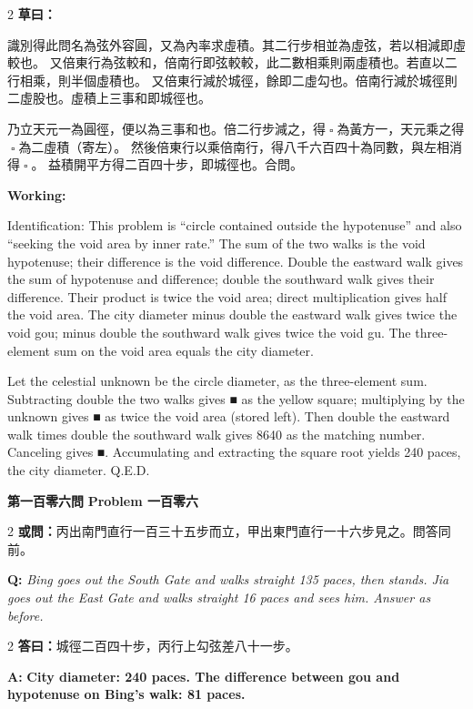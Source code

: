 \documentclass[11pt,a4paper]{article}
\let\origsquare\square
\renewcommand{\square}{\ensuremath{\origsquare}}%
\newcommand{\wen}[1]{%
  \par\vspace{0.5em}%
  \noindent\textcolor{problemcolor}{\textbf{第#1問}}%
  \hfill\textcolor{problemcolor}{\textbf{Problem #1}}\par\nopagebreak%
  \vspace{0.3em}%
}
\newcommand{\owen}[1]{%
  \noindent\textcolor{problemcolor}{\textbf{或問：}}{\tradfont #1}\par\nopagebreak%
}
\newcommand{\oweneng}[1]{%
  \noindent\textcolor{engcolor}{\textbf{Q: }}{\itshape #1}\par\nopagebreak%
}
\newcommand{\tsaoyue}[1]{%
  \noindent\textcolor{workcolor}{\textbf{草曰：}}{\tradfont #1}\par%
}
\newcommand{\tsaoyueeng}[1]{%
  \noindent\textcolor{engcolor}{\textbf{Working: }}{\small #1}\par%
}
\newcommand{\dayue}[1]{%
  \noindent\textcolor{anscolor}{\textbf{答曰：}}{\tradfont #1}\par\nopagebreak%
}
\newcommand{\dayueeng}[1]{%
  \noindent\textcolor{engcolor}{\textbf{A: }}{\bfseries #1}\par\nopagebreak%
}
\begin{document}
\begin{paracol}{2}
\tsaoyue{%
識別得此問名為弦外容圓，又為內率求虛積。其二行步相並為虛弦，若以相減即虛較也。
又倍東行為弦較和，倍南行即弦較較，此二數相乘則兩虛積也。若直以二行相乘，則半個虛積也。
又倍東行減於城徑，餘即二虛勾也。倍南行減於城徑則二虛股也。虛積上三事和即城徑也。

乃立天元一為圓徑，便以為三事和也。倍二行步減之，得$ \; \square \; $為黃方一，天元乘之得$ \; \square \; $為二虛積（寄左）。
然後倍東行以乘倍南行，得八千六百四十為同數，與左相消得$ \; \square \; $。
益積開平方得二百四十步，即城徑也。合問。}
\switchcolumn
\tsaoyueeng{%
Identification: This problem is ``circle contained outside the hypotenuse'' and also ``seeking the void area by inner rate.'' The sum of the two walks is the void hypotenuse; their difference is the void difference. Double the eastward walk gives the sum of hypotenuse and difference; double the southward walk gives their difference. Their product is twice the void area; direct multiplication gives half the void area. The city diameter minus double the eastward walk gives twice the void gou; minus double the southward walk gives twice the void gu. The three-element sum on the void area equals the city diameter.

Let the celestial unknown be the circle diameter, as the three-element sum. Subtracting double the two walks gives ■ as the yellow square; multiplying by the unknown gives ■ as twice the void area (stored left). Then double the eastward walk times double the southward walk gives 8640 as the matching number. Canceling gives ■. Accumulating and extracting the square root yields 240 paces, the city diameter. Q.E.D.}
\end{paracol}

\vspace{0.5cm}

\wen{一百零六}

\begin{paracol}{2}
\owen{丙出南門直行一百三十五步而立，甲出東門直行一十六步見之。問答同前。}
\switchcolumn
\oweneng{Bing goes out the South Gate and walks straight 135 paces, then stands. Jia goes out the East Gate and walks straight 16 paces and sees him. Answer as before.}
\end{paracol}

\begin{paracol}{2}
\dayue{城徑二百四十步，丙行上勾弦差八十一步。}
\switchcolumn
\dayueeng{City diameter: 240 paces. The difference between gou and hypotenuse on Bing's walk: 81 paces.}
\end{paracol}
\end{document}
